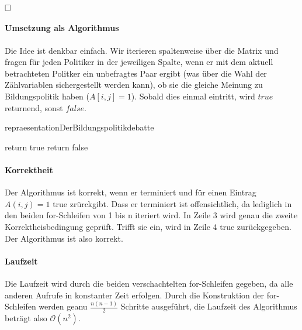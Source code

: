 \documentclass[12pt]{scrartcl}%
\theoremstyle{nonumberplain}
\newcommand{\bO}[1]{\mathcal O(#1)}
\begin{document}
$\hfill \square$

\paragraph{Umsetzung als Algorithmus}

Die Idee ist denkbar einfach. Wir iterieren spaltenweise über die Matrix und fragen für jeden Politiker in der jeweiligen Spalte, wenn er mit dem aktuell betrachteten Politker ein unbefragtes Paar ergibt (was über die Wahl der Zählvariablen sichergestellt werden kann), ob sie die gleiche Meinung zu Bildungspolitik haben ($A[i,j] = 1$). Sobald dies einmal eintritt, wird $true$ returnend, sonst $false$.

\begin{algorithm}[!ht]
	\LinesNumbered
	\caption{repraesentationDerBildungspolitikdebatte}
	
	\BlankLine
	 {
		 {
			 {
				return true\;		
			}	
		}
	}
	return false\;
\end{algorithm}

\paragraph{Korrektheit}

Der Algorithmus ist korrekt, wenn er terminiert und für einen Eintrag $A(i,j) = 1$ true zrürckgibt. Dass er terminiert ist offensichtlich, da lediglich in den beiden for-Schleifen von 1 bis n iteriert wird. In Zeile 3 wird genau die zweite Korrektheisbedingung geprüft. Trifft sie ein, wird in Zeile 4 true zurückgegeben. Der Algorithmus ist also korrekt.

\paragraph{Laufzeit}

Die Laufzeit wird durch die beiden verschachtelten for-Schleifen gegeben, da alle anderen Aufrufe in konstanter Zeit erfolgen. Durch die Konstruktion der for-Schleifen werden geanu $\frac{n(n-1)}{2}$ Schritte ausgeführt, die Laufzeit des Algorithmus beträgt also $\bO{n^2}$.
\end{document}
